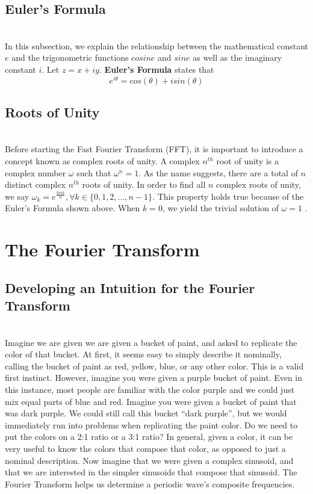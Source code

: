 \documentclass{amsproc}
\begin{document}
\subsection{Euler's Formula}

\mbox{}	 \\
\indent In this subsection, we explain the relationship between the mathematical constant $e$ and the trigonometric functions $cosine$ and $sine$ as well as the imaginary constant $i$. Let $z = x + iy$. \textbf{Euler's Formula} states that \cite{Saff}
$$
e^{i\theta} = cos(\theta) + i sin(\theta)
$$

\subsection{Roots of Unity}

\mbox{}	 \\
\indent Before starting the Fast Fourier Transform (FFT), it is important to introduce a concept known as complex roots of unity. A complex $n^{th}$ root of unity is a complex number $\omega$ such that $\omega^n = 1$. As the name suggests, there are a total of $n$ distinct complex $n^{th}$ roots of unity. In order to find all $n$ complex roots of unity, we say $\omega_k = e^{\frac{2 \pi i k}{n}}, \forall k \in \{0, 1, 2, ... , n-1\}$. This property holds true because of the Euler's Formula shown above. When $k = 0$, we yield the trivial solution of $\omega = 1$ \cite{Saff}.

\section{The Fourier Transform}

\subsection{Developing an Intuition for the Fourier Transform}

\mbox{}	\\
\indent Imagine we are given we are given a bucket of paint, and asked to replicate the color of that bucket. At first, it seems easy to simply describe it nominally, calling the bucket of paint as red, yellow, blue, or any other color.  This is a valid first instinct. However, imagine you were given a purple bucket of paint. Even in this instance, most people are familiar with the color purple and we could just mix equal parts of blue and red. Imagine you were given a bucket of paint that was dark purple. We could still call this bucket “dark purple”, but we would immediately run into problems when replicating the paint color. Do we need to put the colors on a 2:1 ratio or a 3:1 ratio? In general, given a color, it can be very useful to know the colors that compose that color, as opposed to just a nominal description. Now imagine that we were given a complex sinusoid, and that we are interested in the simpler sinusoids that compose that sinusoid. The Fourier Transform helps us determine a periodic wave's composite frequencies.
\end{document}
